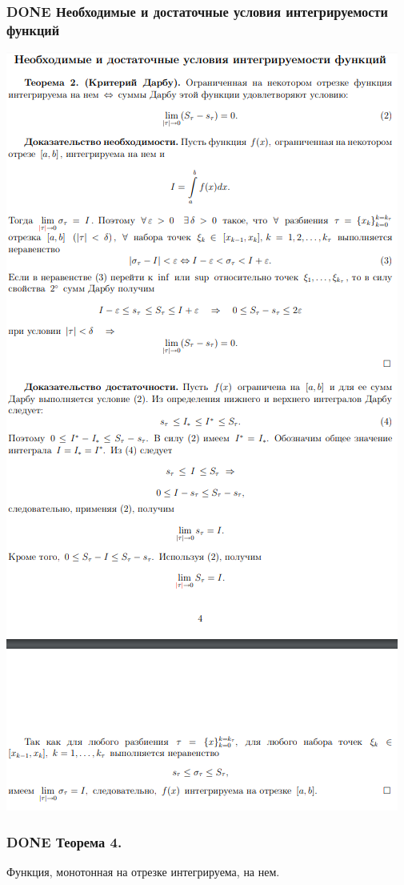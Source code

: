 \documentclass[11pt]{article}
\begin{document}
\subsubsection{{\bfseries\sffamily DONE} Необходимые и достаточные условия интегрируемости функций}
\label{sec:orgf2e2eb3}
\begin{center}
\includegraphics[width=.9\linewidth]{img/b2-ndyintf.png}
\end{center}

\subsubsection{{\bfseries\sffamily DONE} Теорема 4.}
\label{sec:orgeefc8fb}
Функция, монотонная на отрезке интегрируема, на нем.
\end{document}
